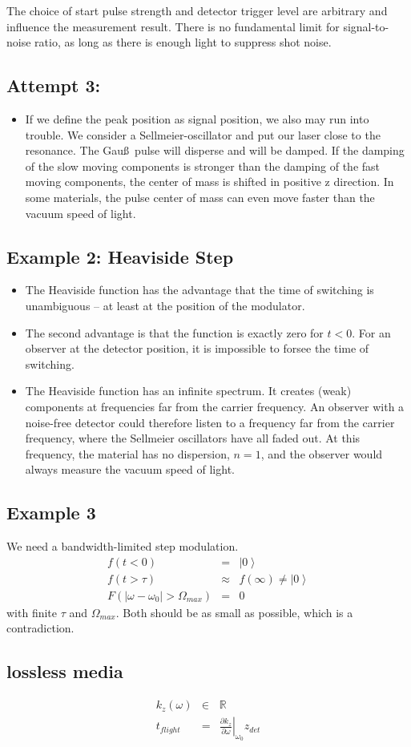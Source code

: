 \documentclass[12pt,a4paper,twoside,openright,BCOR10mm,headsepline,titlepage,abstracton,chapterprefix,final]{scrreprt}
\newcommand\wavenumber{k}
\begin{document}
The choice of start pulse strength and detector trigger level are arbitrary and influence the measurement result.
There is no fundamental limit for signal-to-noise ratio, as long as there is enough light to suppress shot noise.

\subsection{Attempt 3:}

\begin{itemize}
 \item If we define the peak position as signal position, we also may run into trouble.
       We consider a Sellmeier-oscillator and put our laser close to the resonance.
       The Gau\ss\, pulse will disperse and will be damped.
       If the damping of the slow moving components is stronger than the damping of the fast moving components,
       the center of mass is shifted in positive z direction.
       In some materials, the pulse center of mass can even move faster than the vacuum speed of light.
\end{itemize}

\subsection{Example 2: Heaviside Step}
\begin{itemize}
 \item The Heaviside function has the advantage that the time of switching is unambiguous -- at least at the position of the modulator.
 \item The second advantage is that the function is exactly zero for $t<0$.
       For an observer at the detector position, it is impossible to forsee the time of switching.
 \item The Heaviside function has an infinite spectrum.
       It creates (weak) components at frequencies far from the carrier frequency.
       An observer with a noise-free detector could therefore listen to a frequency far from the carrier frequency,
       where the Sellmeier oscillators have all faded out.
       At this frequency, the material has no dispersion, $n=1$, 
       and the observer would always measure the vacuum speed of light.
\end{itemize}

\subsection{Example 3}
We need a bandwidth-limited step modulation.
\begin{eqnarray}
 f( t < 0 ) &=& \left|0\right> \\
 f( t > \tau) &\approx& f(\infty) \neq \left|0\right> \\
 F(|\omega - \omega_0| > \Omega_{max}) &=& 0
\end{eqnarray}
with finite $\tau$ and $\Omega_{max}$.
Both should be as small as possible, which is a contradiction.

\subsection{lossless media}
\begin{eqnarray}
 \wavenumber_z(\omega) &\in& \mathbb{R} \\
 t_{flight} &=& \left. \frac{\partial \wavenumber_z}{\partial \omega}\right|_{\omega_0} z_{det}
\end{eqnarray}
\end{document}
